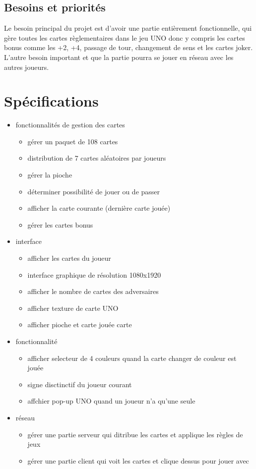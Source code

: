 \documentclass[french]{article}
\begin{document}
\subsection{Besoins et priorités}
Le besoin principal du projet est d'avoir une partie entièrement fonctionnelle, qui gère toutes les cartes règlementaires dans le jeu UNO donc y compris les cartes bonus comme les +2, +4, passage de tour, changement de sens et les cartes joker.
L'autre besoin important et que la partie pourra se jouer en réseau avec les autres joueurs.

\section{Spécifications}
\begin{itemize}
	\item fonctionnalités de gestion des cartes
	\begin{itemize}
		\item gérer un paquet de 108 cartes
		\item distribution de 7 cartes aléatoires par joueurs
		\item gérer la pioche
		\item déterminer possibilité de jouer ou de passer
		\item afficher la carte courante (dernière carte jouée)
		\item gérer les cartes bonus
	\end{itemize}
	\item interface
		\begin{itemize}
			\item afficher les cartes du joueur
			\item interface graphique de résolution 1080x1920
			\item afficher le nombre de cartes des adversaires
			\item afficher texture de carte UNO
			\item afficher pioche et carte jouée carte
		\end{itemize}
	\item fonctionnalité
		\begin{itemize}
			\item afficher selecteur de 4 couleurs quand la carte \og changer de couleur\fg{} est jouée
			\item signe disctinctif du joueur courant
			\item affchier pop-up \og UNO \fg{} quand un joueur n'a qu'une seule
		\end{itemize}
	\item réseau
		\begin{itemize}
			\item gérer une partie serveur qui ditribue les cartes et applique les règles de jeux
			\item gérer une partie client qui voit les cartes et clique dessus pour jouer avec
		\end{itemize}
\end{itemize}
\end{document}
